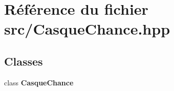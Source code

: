 \section{Référence du fichier src/\-Casque\-Chance.hpp}
\label{_casque_chance_8hpp}
\subsection*{Classes}
\begin{DoxyCompactItemize}
\item 
class {\bf Casque\-Chance}
\end{DoxyCompactItemize}
